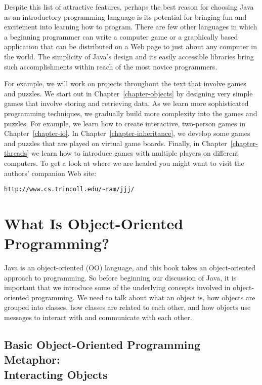\noindent Despite this list of attractive features, perhaps the best reason for
choosing Java as an introductory programming language is its potential
for bringing fun and excitement into learning how to program.  There
are few other languages in which a beginning programmer can write a
computer game or a graphically based application that can be
distributed on a Web page to just about any computer in the world.
The simplicity of Java's design and its easily accessible libraries
bring such accomplishments within reach of the most novice
programmers.

For example, we will work on projects throughout the text that involve
games and puzzles.  We start out in Chapter~\ref{chapter-objects} by designing very simple
games that involve storing and retrieving data.  As we learn more
sophisticated programming techniques, we gradually build more
complexity into the games and puzzles.  For example, we learn how to
create interactive, two-person games in Chapter~\ref{chapter-io}.  In Chapter~\ref{chapter-inheritance}, we
develop some games and puzzles that are played on virtual game boards.
Finally, in Chapter~\ref{chapter-threads} we learn how to introduce games with multiple
players on different computers. To get a look at where we are headed
you might want to visit the authors' companion Web site:

\WWWleft
\begin{jjjlisting}
\begin{lstlisting}[commentstyle=\color{black}\small]
http://www.cs.trincoll.edu/~ram/jjj/
\end{lstlisting}
\end{jjjlisting}

\section{What Is \mbox{Object-Oriented} Programming?}

\noindent Java is an object-oriented (OO) language, and this book
takes an object-oriented approach to programming.  So before beginning
our discussion of Java, it is important that we introduce some of the
underlying concepts involved in object-oriented programming.  We need
to talk about what an object is, how objects are grouped into classes,
how classes are related to each other, and how objects use messages to
interact with and communicate with each other.

\subsection{Basic \mbox{Object-Oriented} Programming Metaphor: 
\\Interacting Objects}

